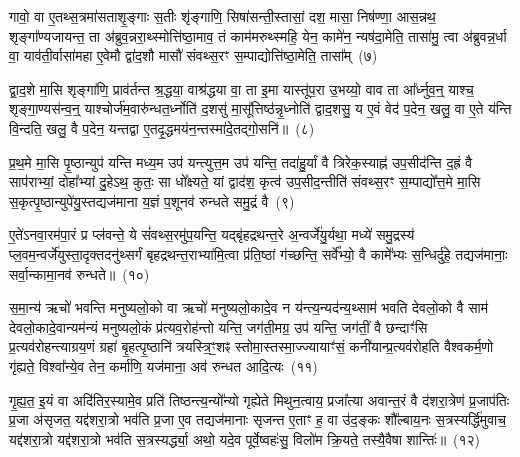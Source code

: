 {\anuvakamend[{गो॒स॒त्रं वा ए॑ति संवथ्स॒रो᳚\-ऽर्धमा॒सा मि॑थु॒नं म॑ध्य॒तो दे॑व॒याने॑नै॒व वी॒र्य॑न्त्रयो॑दश च}]}%

गावो॒ वा ए॒तथ्स॒त्रमा॑सताशृ॒ङ्गाः स॒तीः शृ॑ङ्गाणि॒ सिषा॑सन्ती॒स्तासां॒ दश॒ मासा॒ निष॑ण्णा॒ आस॒न्नथ॒ शृङ्गा᳚ण्यजायन्त॒ ता अ॑ब्रुव॒न्नरा॒थ्स्मोत्ति॑ष्ठा॒माव॒ तं काम॑मरुथ्स्महि॒ येन॒ कामे॑न॒ न्यष॑दा॒मेति॒ तासा॑मु॒ त्वा अ॑ब्रुवन्न॒र्धा वा॒ याव॑ती॒र्वासा॑महा ए॒वेमौ द्वा॑द॒शौ मासौ॑ संवथ्स॒रꣳ स॒म्पाद्योत्ति॑ष्ठा॒मेति॒ तासा᳚म्~(७)

द्वा॒द॒शे मा॒सि शृङ्गा॑णि॒ प्राव॑र्तन्त श्र॒द्धया॒ वाश्र॑द्धया वा॒ ता इ॒मा यास्तू॑प॒रा उ॒भय्यो॒ वाव ता आ᳚र्ध्नुव॒न्॒ याश्च॒ शृङ्गा॒ण्यस॑न्व॒न्॒ याश्चोर्ज॑म॒वारु॑न्धत॒र्ध्नोति॑ द॒शसु॑ मा॒सू᳚त्तिष्ठ॑न्नृ॒ध्नोति॑ द्वाद॒शसु॒ य ए॒वं वेद॑ प॒देन॒ खलु॒ वा ए॒ते य॑न्ति वि॒न्दति॒ खलु॒ वै प॒देन॒ यन्तद्वा ए॒तदृ॒द्धमय॑न॒न्तस्मा॑दे॒तद्गो॒सनि॑॥~(८)

{\anuvakamend[{ति॒ष्ठा॒मेति॒ तासा॒न्तस्मा॒द्द्वे च॑}]}%

प्र॒थ॒मे मा॒सि पृ॒ष्ठान्युप॑ यन्ति मध्य॒म उप॑ यन्त्युत्त॒म उप॑ यन्ति॒ तदा॑हु॒र्यां वै त्रिरेक॒स्याह्न॑ उप॒सीद॑न्ति द॒ह्रं वै साप॑राभ्यां॒ दोहा᳚भ्यां दु॒हे\-ऽथ॒ कुतः॒ सा धो᳚क्ष्यते॒ यां द्वाद॑श॒ कृत्व॑ उप॒सीद॒न्तीति॑ संवथ्स॒रꣳ स॒म्पाद्यो᳚त्त॒मे मा॒सि स॒कृत्पृ॒ष्ठान्युपे॑यु॒स्तद्यज॑माना य॒ज्ञं प॒शूनव॑ रुन्धते समु॒द्रं वै~(९)

ए॒ते॑\-ऽनवा॒रम॑पा॒रं प्र प्ल॑वन्ते॒ ये सं॑वथ्स॒रमु॑प॒यन्ति॒ यद्बृ॑हद्रथन्त॒रे अ॒न्वर्जे॑यु॒र्यथा॒ मध्ये॑ समु॒द्रस्य॑ प्ल॒वम॒न्वर्जे॑युस्ता॒दृक्त\-दनु॑थ्सर्गं बृहद्रथन्त॒राभ्या॑मि॒त्वा प्र॑ति॒ष्ठां ग॑च्छन्ति॒ सर्वे᳚भ्यो॒ वै कामे᳚भ्यः स॒न्धिर्दु॑हे॒ तद्यज॑मानाः॒ सर्वा॒न्कामा॒नव॑ रुन्धते॥~(१०)

{\anuvakamend[{स॒मु॒द्रं वै चतु॑स्त्रिꣳशच्च}]}%

स॒मा॒न्य॑ ऋचो॑ भवन्ति मनुष्यलो॒को वा ऋचो॑ मनुष्यलो॒कादे॒व न य॑न्त्य॒न्यद॑न्य॒थ्साम॑ भवति देवलो॒को वै साम॑ देवलो॒कादे॒वान्यम॑न्यं मनुष्यलो॒कं प्र॑त्यव॒रोह॑न्तो यन्ति॒ जग॑ती॒मग्र॒ उप॑ यन्ति॒ जग॑तीं॒ वै छन्दाꣳ॑सि प्र॒त्यव॑रोहन्त्याग्रय॒णं ग्रहा॑ बृ॒हत्पृ॒ष्ठानि॑ त्रयस्त्रि॒ꣳ॒शꣴ स्तोमा॒स्तस्मा॒ज्ज्यायाꣳ॑सं॒ कनी॑यान्प्र॒त्यव॑रोहति वैश्वकर्म॒णो गृ॑ह्यते॒ विश्वा᳚न्ये॒व तेन॒ कर्मा॑णि॒ यज॑माना॒ अव॑ रुन्धत आदि॒त्यः~(११)

गृ॒ह्य॒त॒ इ॒यं वा अदि॑तिर॒स्यामे॒व प्रति॑ तिष्ठन्त्य॒न्यो᳚न्यो गृह्येते मिथुन॒त्वाय॒ प्रजा᳚त्या अवान्त॒रं वै द॑शरा॒त्रेण॑ प्र॒जा\-प॑तिः प्र॒जा अ॑सृजत॒ यद्द॑शरा॒त्रो भव॑ति प्र॒जा ए॒व तद्यज॑मानाः सृजन्त ए॒ताꣳ ह॒ वा उ॑द॒ङ्कः शौ᳚ल्बाय॒नः स॒त्रस्यर्द्धि॑मुवाच॒ यद्द॑शरा॒त्रो यद्द॑शरा॒त्रो भव॑ति स॒त्रस्यर्द्ध्या॒ अथो॒ यदे॒व पूर्वे॒ष्वहः॑सु॒ विलो॑म क्रि॒यते॒ तस्यै॒वैषा शान्तिः॑॥~(१२)


